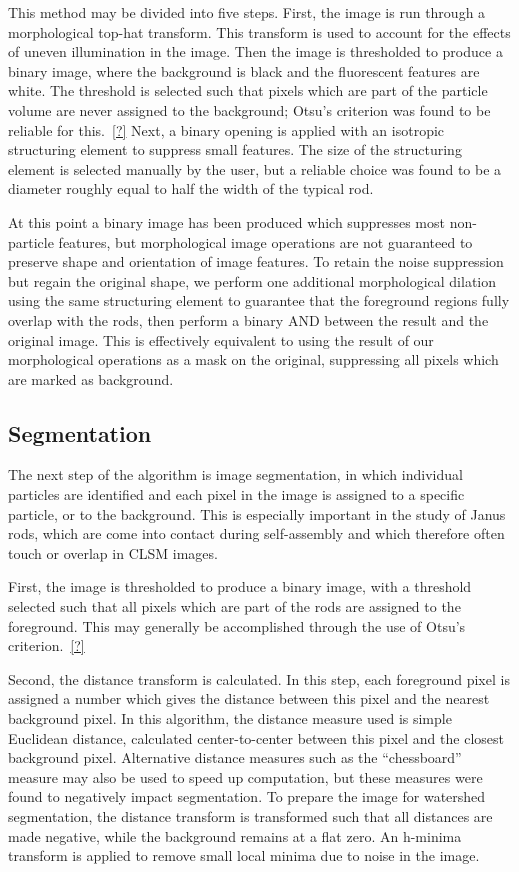 This method may be divided into five steps. First, the 
image is run through a morphological top-hat transform. This transform is used to account for the effects of
uneven illumination in the image. Then the image is thresholded to produce a binary image, where the 
background is black and the fluorescent features are white. The threshold is selected such that pixels which 
are part of the particle volume are never assigned to the background; Otsu's criterion was found to be reliable
for this.~\ref{?}  Next, a binary opening is applied with an isotropic structuring element to
suppress small features. The size of the structuring element is selected manually by the user, but a 
reliable choice was found to be a diameter roughly equal to half the width of the typical rod. 

At this point a binary image has been produced which suppresses most non-particle features, but morphological
image operations are not guaranteed to preserve shape and orientation of image features.  To retain the noise suppression
but regain the original shape, we perform one additional morphological dilation using the same structuring element to
guarantee that the foreground regions fully overlap with the rods, then perform a binary AND between the result and the
original image. This is effectively equivalent to using the result of our morphological operations as a mask on
the original, suppressing
all pixels which are marked as background.

\subsection{Segmentation}

The next step of the algorithm is image segmentation, in which individual particles are identified and each pixel
in the image is assigned to a specific particle, or to the background. This is especially important in the study 
of Janus rods, which are come into contact during self-assembly and which therefore often touch or overlap in 
CLSM images. 

First, the image is thresholded to produce a binary image, with a threshold selected such that all pixels which
are part of the rods are assigned to the foreground. This may generally be accomplished through the use of 
Otsu's criterion.~\ref{?}

Second, the distance transform is calculated.  In this step, each foreground pixel is assigned a number which
gives the distance between this pixel and the nearest background pixel. In this algorithm, the distance measure used
is simple Euclidean distance, calculated center-to-center between this pixel and the closest background pixel.  Alternative
distance measures such as the ``chessboard'' measure may also be used to speed up computation, but these measures were
found to negatively impact segmentation.  To prepare the image for watershed segmentation, the distance 
transform is transformed such that all distances are made
negative, while the background remains at a flat zero. An h-minima transform is applied to remove small local minima
due to noise in the image.

